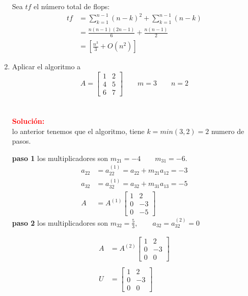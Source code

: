 \begin{enumerate}[label=(\alph*)]
	Sea $tf$ el número total de flops:
    \begin{align*}
		tf &=\sum_{k=1}^{n-1}(n-k)^2 + \sum_{k=1}^{n-1}(n-k)\\
		&=\frac{n(n-1)(2n-1)}{6} + \frac{n(n-1)}{2}\\
		&=\left[ \frac{n^3}{3} + O(n^2)\right]
    \end{align*}
    
    \item Aplicar el algoritmo a
    \[
    A = 
    \begin{bmatrix}
    1 & 2 \\
    4 & 5 \\
    6 & 7 
    \end{bmatrix}
    \qquad
    m = 3 \qquad n = 2
    \]
     \\\\
    \noindent \textcolor{red}{\bf Solución:}\\ 
    lo anterior tenemos que el algoritmo, tiene  $k= min ( 3,2 ) = 2$ numero de pasos.

\textbf{paso 1} los multiplicadores son $m_{21} = -4 \qquad m_{31} = -6$.
\begin{align*}
	a_{22} &= a_{22}^{ ( 1 ) } = a_{22} + m_{21}a_{12} = -3 \\
	a_{32} &= a_{32}^{ ( 1 ) } = a_{32} + m_{31}a_{13} = -5 \\ 
	A &= A^{( 1 )}
\begin{bmatrix}
1 & 2 \\
0 & -3 \\
0 & -5 
\end{bmatrix}
\end{align*}
\textbf{paso 2} los multiplicadores son $m_{32} = \frac{5}{3} ,\qquad a_{32}=a_{32}^{ ( 2 ) } = 0$

\begin{align*}
		A &= A^{( 2 )}
\begin{bmatrix}
1 & 2 \\
0 & -3 \\
0 & 0 
\end{bmatrix} \\
\\
U &= 
\begin{bmatrix}
1 & 2 \\
0 & -3 \\
0 & 0 
\end{bmatrix}
\end{align*}


\end{enumerate}
